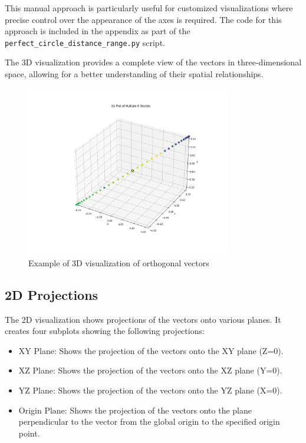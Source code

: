 This manual approach is particularly useful for customized visualizations where precise control over the appearance of the axes is required. The code for this approach is included in the appendix as part of the \texttt{perfect\_circle\_distance\_range.py} script.

The 3D visualization provides a complete view of the vectors in three-dimensional space, allowing for a better understanding of their spatial relationships.

\begin{figure}[H]
    \centering
    \includegraphics[width=0.8\textwidth]{figures/orthogonal_3d.png}
    \caption{Example of 3D visualization of orthogonal vectors}
    \label{fig:vis_3d_plot}
\end{figure}

\subsection{2D Projections}

The 2D visualization shows projections of the vectors onto various planes. It creates four subplots showing the following projections:

\begin{itemize}
    \item XY Plane: Shows the projection of the vectors onto the XY plane (Z=0).
    \item XZ Plane: Shows the projection of the vectors onto the XZ plane (Y=0).
    \item YZ Plane: Shows the projection of the vectors onto the YZ plane (X=0).
    \item Origin Plane: Shows the projection of the vectors onto the plane perpendicular to the vector from the global origin to the specified origin point.
\end{itemize}

